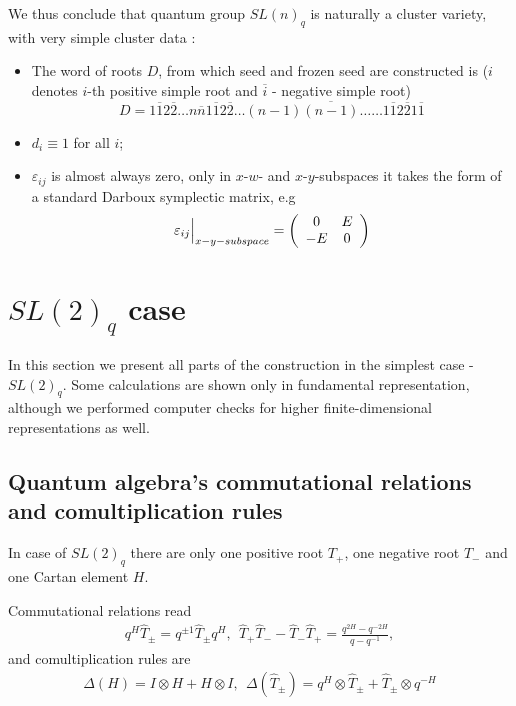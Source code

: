 \documentclass{article}
\newcommand{\lb}{\left (}
\newcommand{\rb}{\right )}
\newcommand{\be}{\begin{eqnarray}}
\newcommand{\ee}{\end{eqnarray}}
\newcommand{\ve}{\varepsilon}
\newcommand {\?}{\textit{???}}
\newcommand{\hT}[0]{\hat{T}}
\begin{document}
We thus conclude that quantum group $SL(n)_q$ is naturally a cluster  variety,
with very simple cluster data \cite{FG2}:
\begin{itemize}
\item The word of roots $D$, from which seed and frozen seed are constructed is
($i$ denotes $i$-th positive simple root and $\overline{i}$ - negative simple root)
\begin{equation}
D = 1 \overline{1} 2 \overline{2} \dots n \overline{n} 1 \overline{1} 2 \overline{2} \dots (n - 1)\overline{(n-1)}
\dots \dots 1 \overline{1} 2 \overline{2} 1 \overline{1}
\end{equation}
\item $d_i \equiv 1$ for all $i$;
\item $\ve_{ij}$ is almost always zero, only in $x$-$w$- and $x$-$y$-subspaces
  it takes the form of a standard Darboux symplectic matrix, e.g
\begin{equation}
  \ve_{ij} \Big{|}_{x-y-subspace} = \lb \begin{array}{cc} 0 & E \\ -E & 0 \end{array} \rb
\end{equation}

\end{itemize}

\section {$SL(2)_q$ case}
\label{sec:sl2q-case}
In this section we present all parts of the construction in the simplest case - $SL(2)_q$.
Some calculations are shown only in fundamental representation, although
we performed computer checks for higher finite-dimensional representations as well.

\subsection{Quantum algebra's commutational relations and comultiplication rules}
In case of $SL(2)_q$ there are only one positive root $T_{+}$, one negative root $T_{-}$
and one Cartan element $H$.

Commutational relations read
\be
\label{comm-relations-sl2}
q^H \hT_{\pm} = q^{\pm 1} \hT_{\pm} q^H,\ \ \hT_+ \hT_- - \hT_- \hT_+ = \frac{q^{2H} - q^{-2H}}{q - q^{-1}},
\ee
and comultiplication rules are
\be
\Delta(H) = I \otimes H + H \otimes I, \ \ \Delta(\hT_\pm) = q^H \otimes \hT_\pm + \hT_\pm \otimes q^{-H}
\ee
\end{document}
